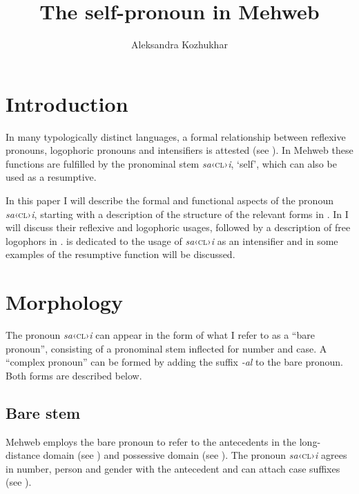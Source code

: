 ﻿\documentclass[output=paper]{langsci/langscibook}
\title{The self-pronoun in Mehweb}
\author{Aleksandra Kozhukhar\affiliation{National Research University Higher School of Economics}}
\begin{document}
\maketitle

\section{Introduction}

In many typologically distinct languages, a formal relationship between
reflexive pronouns, logophoric pronouns and intensifiers is attested 
(see \citealt{könig-etal2013}). In Mehweb these functions are fulfilled by the pronominal
stem \emph{sa}‹\textsc{cl}›\emph{i}, `self', which can also be used as a
resumptive.

In this paper I will describe the formal and functional aspects of the
pronoun \emph{sa}‹\textsc{cl}›\emph{i}, starting with a description of the
structure of the relevant forms in . In  I will
discuss their reflexive and logophoric usages, followed by a description
of free logophors in .  is dedicated to the usage of
\emph{sa}‹\textsc{cl}›\emph{i} as an intensifier and in  some examples
of the resumptive function will be discussed.

\section{Morphology}\label{morphology}

The pronoun \emph{sa}‹\textsc{cl}›\emph{i} can appear in the form of what I refer to
as a ``bare pronoun'', consisting of a pronominal stem inflected for
number and case. A ``complex pronoun'' can be formed by adding the suffix
\emph{-al} to the bare pronoun. Both forms are described below.

\subsection{Bare stem}

Mehweb employs the bare pronoun to refer to the antecedents in the
long-distance domain (see ) and possessive domain (see
). The pronoun \emph{sa}‹\textsc{cl}›\emph{i} agrees in number, person and
gender with the antecedent and can attach case suffixes (see ).
\end{document}
